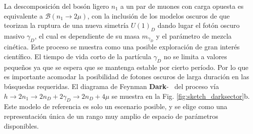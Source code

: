 La descomposición del bosón ligero $n_1$ a un par de muones con carga opuesta es equivalente a $\mathcal{B}(n_1 \rightarrow 2\mu)$, con la inclusión de los modelos oscuros de \SUSY que teorizan la ruptura de una nueva simetría $U(1)_D$ dando lugar el fotón oscuro masivo $\gamma_D$, el cual es dependiente de su masa $m_{\gamma_D}$ y el parámetro de mezcla cinética. Este proceso se muestra como una posible exploración de gran interés científico. El tiempo de vida corto de la partícula $\gamma_D$ no se limita a valores pequeños ya que se espera que se mantenga estable por cierto período. Por lo que es importante acomodar la posibilidad de fotones oscuros de larga duración en las búsquedas requeridas. El diagrama de Feynman \textbf{Dark}-\SUSY ~ del proceso vía $h \rightarrow 2n_1 \rightarrow 2n_D + 2\gamma_D \rightarrow 2n_D + 4\mu$ se muestra en la Fig. \ref{fig:sketch_darksector}b. Este modelo de referencia es solo un escenario posible, y se elige como una representación única de un rango muy amplio de espacio de parámetros disponibles. %































